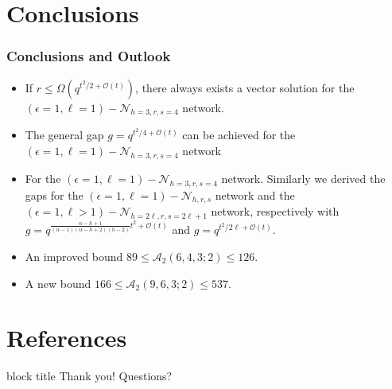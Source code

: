 \documentclass[c]{beamer}
\begin{document}
\section{Conclusions}
\begin{frame}[c]
\frametitle{Conclusions and Outlook}
	
	\begin{itemize}
		\item If $r\leq\Omega\left(q^{t^{2}/2+\mathcal{O}\left(t\right)}\right)$,
there always exists a vector solution for the $\left(\epsilon=1,\ell=1\right)-\mathcal{N}_{h=3,r,s=4}$
network.
		\item The
general gap $g=q^{t^{2}/4+\mathcal{O}(t)}$ can be achieved for the $\left(\epsilon=1,\ell=1\right)-\mathcal{N}_{h=3,r,s=4}$
network
		\item For the $\left(\epsilon=1,\ell=1\right)-\mathcal{N}_{h=3,r,s=4}$
network. Similarly we derived the gaps for the $\left(\epsilon=1,\ell=1\right)-\mathcal{N}_{h,r,s}$
network and the $\left(\epsilon=1,\ell>1\right)-\mathcal{N}_{h=2\ell,r,s=2\ell+1}$
network, respectively with $g=q^{\frac{\alpha-h+1}{\left(\alpha-1\right)\left(\alpha-h+2\right)\left(h-2\right)}t^{2}+\mathcal{O}(t)}$
and $g=q^{t^{2}/2\ell+\mathcal{O}(t)}$.
		\item An improved bound $89\leq\mathcal{A}_{2}\left(6,4,3;2\right)\leq126$.
		\item A new bound $166\leq\mathcal{A}_{2}\left(9,6,3;2\right)\leq537$.
	\end{itemize}

\end{frame}



\section*{References}
\begin{frame}[b]

	\vskip15pt
	\begin{beamercolorbox}[center,rounded=true,sep=2mm,shadow=true]{block title}
		\Large Thank you! Questions?	
	\end{beamercolorbox}

	
	\vskip25pt
	
	
	\vskip3pt
\end{frame}
\end{document}
